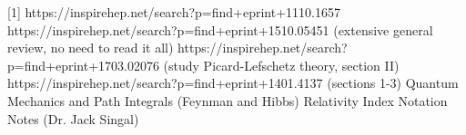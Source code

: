 \documentclass[12pt]{revtex4}
\begin{document}
\begin{thebibliography}{}

[1] https://inspirehep.net/search?p=find+eprint+1110.1657 \newline
[2] https://inspirehep.net/search?p=find+eprint+1510.05451  (extensive general review, no need to read it all) \newline
[3] https://inspirehep.net/search?p=find+eprint+1703.02076   (study Picard-Lefschetz theory, section II) \newline
[4] https://inspirehep.net/search?p=find+eprint+1401.4137   (sections 1-3) \newline
[5] Quantum Mechanics and Path Integrals (Feynman and Hibbs) \newline
[6] Relativity Index Notation Notes (Dr. Jack Singal) \newline
[7] \newline
[8] \newline
\end{thebibliography}
\end{document}
